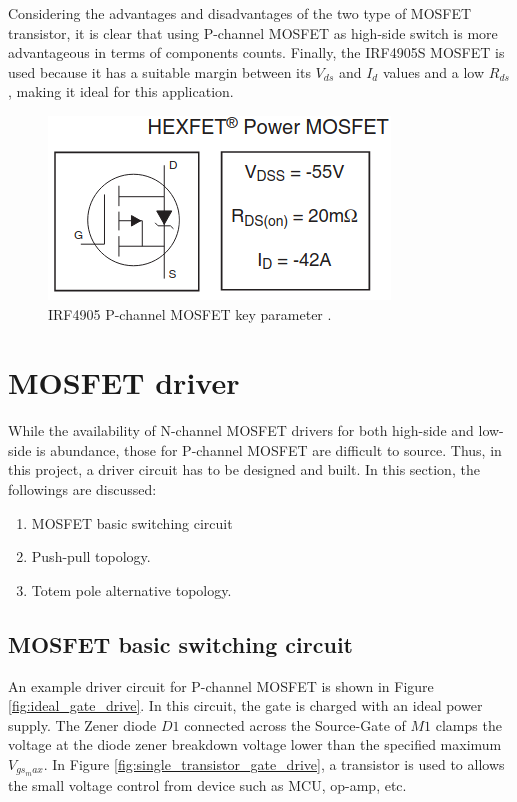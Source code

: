 \documentclass[main.tex]{subfiles}
\begin{document}
    \justify
    Considering the advantages and disadvantages of the two type of MOSFET transistor, it is clear that using P-channel MOSFET as high-side switch is more advantageous in terms of components counts. Finally, the IRF4905S MOSFET is used because it has a suitable margin between its $V_{ds}$ and $I_{d}$ values and a low $R_{ds}$, making it ideal for this application. 

    \begin{figure}[!h]
        \centerline{\includegraphics[scale=0.5]{media/IRF4905_key_parameters.png}}
        \caption{IRF4905 P-channel MOSFET key parameter \cite{IRF4905S}.}
        \label{fig:IRF4905S_param}
    \end{figure}    
    
    \pagebreak
    \section{MOSFET driver}
    \justify
    While the availability of N-channel MOSFET drivers for both high-side and low-side is abundance, those for P-channel MOSFET are difficult to source. Thus, in this project, a driver circuit has to be designed and built. In this section, the followings are discussed:
    \begin{enumerate}
        \item MOSFET basic switching circuit
        \item Push-pull topology.
        \item Totem pole alternative topology.
    \end{enumerate}   

    \pagebreak
    \subsection{MOSFET basic switching circuit} 
    
    An example driver circuit for P-channel MOSFET is shown in Figure \ref{fig:ideal_gate_drive}. In this circuit, the gate is charged with an ideal power supply. The Zener diode $D1$ connected across the Source-Gate of $M1$ clamps the voltage at the diode zener breakdown voltage lower than the specified maximum $V_{gs_max}$. In Figure \ref{fig:single_transistor_gate_drive}, a transistor is used to allows the small voltage control from device such as MCU, op-amp, etc.
\end{document}
